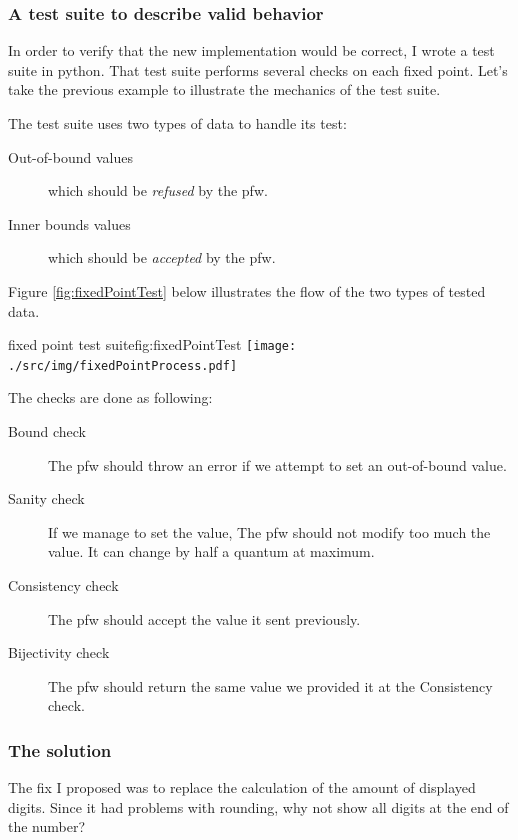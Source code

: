 \subsubsection{A test suite to describe valid behavior}

In order to verify that the new implementation would be correct, I wrote a test suite
in \gls{python}. That test suite performs several checks on each fixed point. Let's
take the previous example to illustrate the mechanics of the test suite.

The test suite uses two types of data to handle its test:
\begin{description}
    \item[Out-of-bound values] which should be \emph{refused} by the \gls{pfw}.
    \item[Inner bounds values] which should be \emph{accepted} by the \gls{pfw}.
\end{description}

Figure \ref{fig:fixedPointTest} below illustrates the flow of the two types of tested data.

\begin{figureGraphics}{fixed point test suite}{fig:fixedPointTest}
    \texttt{[image: ./src/img/fixedPointProcess.pdf]}
\end{figureGraphics}

The checks are done as following:
\begin{description}
    \item[Bound check] The \gls{pfw} should throw an error if we
        attempt to set an out-of-bound value.
    \item[Sanity check] If we manage to set the value, The \gls{pfw} should not modify too much
        the value. It can change by half a quantum at maximum.
    \item[Consistency check] The \gls{pfw} should accept the value it sent previously.
    \item[Bijectivity check] The \gls{pfw} should return the same value we provided it at the Consistency check.
\end{description}

\subsubsection{The solution}
The fix I proposed was to replace the calculation of the amount of displayed digits.
Since it had problems with rounding, why not show all digits at the end of the number?

